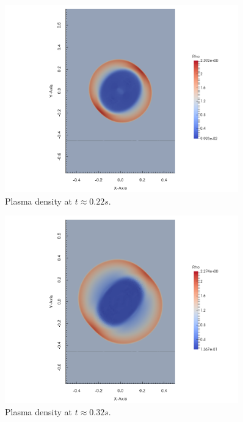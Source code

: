 \begin{figure}[H]
    \vspace{-5mm}
    \begin{center}
        \includegraphics[width=0.9\textwidth]{img/density-18.png}
    \end{center} 
    \vspace{-10mm}
    \caption{Plasma density at $t \approx 0.22s$.}
\end{figure} 
\begin{figure}[H]
    \vspace{-5mm}
    \begin{center}
        \includegraphics[width=0.9\textwidth]{img/density-20.png}
    \end{center} 
    \vspace{-10mm}
    \caption{Plasma density at $t \approx 0.32s$.}
\end{figure} 

